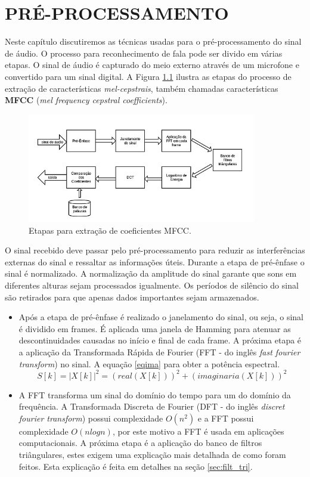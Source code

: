 \chapter{PRÉ-PROCESSAMENTO}
 \thispagestyle{plain}
\label{chap:pre_proc}
Neste capítulo discutiremos as técnicas usadas para o pré-processamento do sinal de áudio. O processo para reconhecimento de fala pode ser divido em várias etapas. O sinal de áudio é capturado do meio externo através de um microfone e convertido para um sinal digital. A  Figura \ref{fig:diaMFCC} ilustra as etapas do processo de extração de características \textit{mel-cepstrais}, também chamadas características \textbf{MFCC} (\textit{mel frequency cepstral coefficients}).

\begin{figure}[H]
\centering %
\includegraphics[width=10cm]{img/diaMFCC.jpg} %
\caption{Etapas para extração de coeficientes MFCC.}
\label{fig:diaMFCC}
\end{figure}

O sinal recebido deve passar pelo pré-processamento para reduzir as interferências externas do sinal e ressaltar as informações úteis. Durante a etapa de pré-ênfase o sinal é normalizado. A normalização da amplitude do sinal garante que sons em diferentes alturas sejam processados igualmente. Os períodos de silêncio do sinal são retirados para que apenas dados importantes sejam armazenados.
\begin{itemize}
 \item Após a etapa de pré-ênfase é realizado o janelamento do sinal, ou seja, o sinal é dividido em frames. É aplicada uma janela de Hamming para atenuar as descontinuidades causadas no início e final de cada frame.  A próxima etapa é a aplicação da Transformada Rápida de Fourier (FFT - do inglês \textit{fast fourier transform}) no sinal. A equação \ref{eqima} para obter a potência espectral.
\begin{equation}
\label{eqima}
S[k] = |X[k]|^2 = (real(X[k]))^2 +  (imaginaria(X[k]))^2
\end{equation}
 \item A FFT transforma um sinal do domínio do tempo para um do domínio da frequência.  A  Transformada Discreta de Fourier (DFT - do inglês \textit{discret fourier transform}) possui complexidade $O(n^2)$ e a FFT possui complexidade $O(n log n)$, por este motivo a FFT é usada em aplicações computacionais. A próxima etapa é a aplicação do banco de filtros triângulares, estes exigem uma explicação mais detalhada de como foram feitos. Esta explicação é feita em detalhes na seção \ref{sec:filt_tri}.
 \end{itemize}

